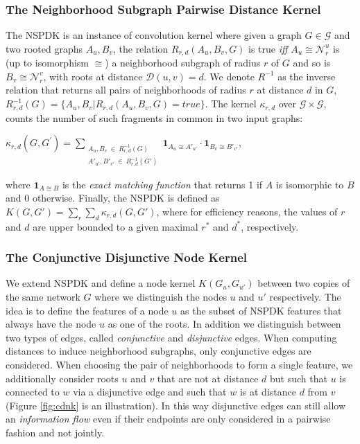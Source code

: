 \documentclass[review]{elsarticle}
\begin{document}
\subsubsection{The Neighborhood Subgraph Pairwise Distance Kernel}
The NSPDK is an instance of convolution kernel \cite{haussler1999convolution} where given a graph $G \in \mathcal{G}$ and two rooted graphs $A_u, B_v$, the relation $R_{r,d}(A_u, B_v, G)$ is true {\em iff} $A_u \cong \mathcal{N}_r^u$ is (up to isomorphism $\cong$) a neighborhood subgraph of radius $r$ of $G$ and so is $B_v \cong  \mathcal{N}_r^v$, with roots at distance $\mathcal{D}(u,v)= d$. We denote $R^{-1}$ as the inverse relation that returns all pairs of neighborhoods of radius $r$ at distance $d$ in $G$, $R^{-1}_{r,d}(G) = \lbrace A_u, B_v | R_{r,d}(A_u,B_v,G)=true\rbrace$. The kernel $\kappa_{r,d}$ over $\mathcal{G} \times \mathcal{G}$, counts the number of such fragments in common in two input graphs: 
\begin{center}
$\kappa_{r,d}(G,G^{'}) = 
\!\!\!\!\!\!\!\!\!\!\!\! 
\sum\limits_{\substack{A_u, B_v \ \in \ R_{r,d}^{-1}(G) \\ 
{A'}_{u'}, {B'}_{v'} \ \in \ R_{r,d}^{-1}(G')
}} \!\!\!\!\!\!\!\!\!\!\!\!  { { \textbf{1}_{A_{u} \cong A'_{u'}}} \cdot {
\textbf{1}_{B_{v} \cong B'_{v'}}} }$, 
\end{center} 
\noindent where $\textbf{1}_{A \cong B}$ is the \textit{exact matching function} that returns 1 if $A$ is
isomorphic to $B$ and 0 otherwise.  Finally, the NSPDK is defined as $K(G,G') = \sum\limits_{r}{\sum\limits_{d}{\kappa_{r,d}(G,G')}}$, where for efficiency reasons, the values of $r$ and $d$ are upper bounded to a given maximal $r^*$ and $d^*$, respectively.

\subsubsection{The Conjunctive Disjunctive Node Kernel}
We extend NSPDK and define a node kernel $K(G_u,G_{u'})$ between two copies of the same network $G$ where we distinguish the nodes $u$ and $u'$ respectively. The idea is to define the features of a node $u$ as the subset of NSPDK features that always have the node $u$ as one of the roots. In addition we distinguish between two types of edges, called {\em conjunctive} and {\em disjunctive} edges. When computing distances to induce neighborhood subgraphs, only conjunctive edges are considered. When choosing the
pair of neighborhoods to form a single feature, we additionally consider roots $u$ and $v$ that are not at distance $d$ but such that $u$ is connected to $w$ via a disjunctive edge and such that $w$ is at distance $d$ from $v$ (Figure \ref{fig:cdnk} is an illustration). In this way disjunctive edges can still allow an {\em information flow} even if their
endpoints are only considered in a pairwise fashion and not jointly. 
\end{document}
